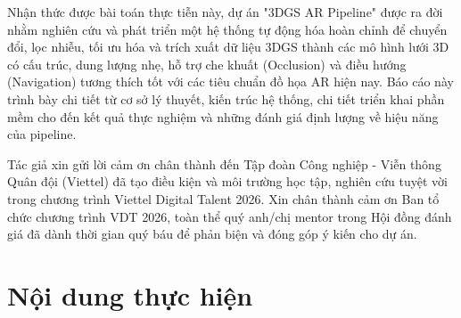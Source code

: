 \documentclass[a4paper,12pt]{report}
\begin{document}
Nhận thức được bài toán thực tiễn này, dự án "3DGS AR Pipeline" được ra đời nhằm nghiên cứu và phát triển một hệ thống tự động hóa hoàn chỉnh để chuyển đổi, lọc nhiễu, tối ưu hóa và trích xuất dữ liệu 3DGS thành các mô hình lưới 3D có cấu trúc, dung lượng nhẹ, hỗ trợ che khuất (Occlusion) và điều hướng (Navigation) tương thích tốt với các tiêu chuẩn đồ họa AR hiện nay. Báo cáo này trình bày chi tiết từ cơ sở lý thuyết, kiến trúc hệ thống, chi tiết triển khai phần mềm cho đến kết quả thực nghiệm và những đánh giá định lượng về hiệu năng của pipeline.

Tác giả xin gửi lời cảm ơn chân thành đến Tập đoàn Công nghiệp - Viễn thông Quân đội (Viettel) đã tạo điều kiện và môi trường học tập, nghiên cứu tuyệt vời trong chương trình Viettel Digital Talent 2026. Xin chân thành cảm ơn Ban tổ chức chương trình VDT 2026, toàn thể quý anh/chị mentor trong Hội đồng đánh giá đã dành thời gian quý báu để phản biện và đóng góp ý kiến cho dự án.

\chapter*{Nội dung thực hiện}
\end{document}
